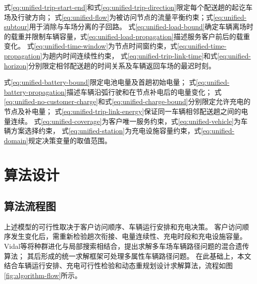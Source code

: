 \documentclass{setp-new}
\begin{document}
式\eqref{eq:unified-trip-start-end}和式\eqref{eq:unified-trip-direction}限定每个配送趟的起讫车场及行驶方向；
式\eqref{eq:unified-flow}为被访问节点的流量平衡约束；式\eqref{eq:unified-subtour}用于消除与车场分离的子回路。
式\eqref{eq:unified-load-bound}确定车辆离场时的载重并限制车辆容量，式\eqref{eq:unified-load-propagation}描述服务客户前后的载重变化。
式\eqref{eq:unified-time-window}为节点时间窗约束，式\eqref{eq:unified-time-propagation}为趟内时间连续性约束，
式\eqref{eq:unified-trip-link-time}和式\eqref{eq:unified-horizon}分别限定相邻配送趟的时间关系及车辆返回车场的最迟时刻。

式\eqref{eq:unified-battery-bound}限定电池电量及首趟初始电量；
式\eqref{eq:unified-battery-propagation}描述车辆沿弧行驶和在节点补电后的电量变化；
式\eqref{eq:unified-no-customer-charge}和式\eqref{eq:unified-charge-bound}分别限定允许充电的节点及补电量；
式\eqref{eq:unified-trip-link-energy}保证同一车辆相邻配送趟之间的电量连续。
式\eqref{eq:unified-coverage}为客户唯一服务约束，式\eqref{eq:unified-vehicle}为车辆方案选择约束，
式\eqref{eq:unified-station}为充电设施容量约束，式\eqref{eq:unified-domain}规定决策变量的取值范围。

\section{算法设计}

\subsection{算法流程图}

上述模型的可行性取决于客户访问顺序、车辆运行安排和充电决策。
客户访问顺序发生变化后，需重新检验趟次衔接、电量连续性、充电时段和充电设施容量。
Vidal等\cite{ref:76}将种群进化与局部搜索相结合，提出求解多车场车辆路径问题的混合遗传算法；
其后形成的统一求解框架可处理多属性车辆路径问题\cite{ref:77}。
在此基础上，本文结合车辆运行安排、充电可行性检验和动态重规划设计求解算法，流程如图\ref{fig:algorithm-flow}所示。
\end{document}

